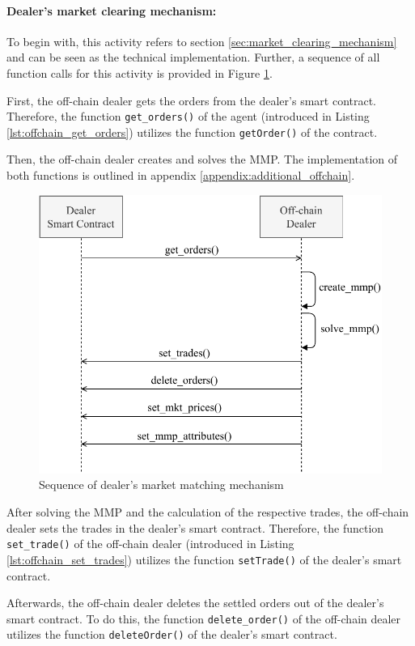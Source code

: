 \paragraph{Dealer's market clearing mechanism:}
To begin with, this activity refers to section \ref{sec:market_clearing_mechanism} and can be seen as
the technical implementation. Further, a sequence of all function 
calls for this activity is provided in Figure \ref{figure:dealers_mmp}.

First, the off-chain dealer gets the orders from the dealer's smart contract.
Therefore, the function \verb|get_orders()| of the agent (introduced in Listing \ref{lst:offchain_get_orders})
utilizes the function \verb|getOrder()| of the contract.

Then, the off-chain dealer creates and solves the MMP.
The implementation of both functions is outlined in appendix \ref{appendix:additional_offchain}.

\begin{figure}[htbp]
	\centering
	\includegraphics[width=.8\linewidth]{./figures/dealers_mmp.pdf}
	\caption{Sequence of dealer's market matching mechanism}
	\label{figure:dealers_mmp}
\end{figure}

After solving the MMP and the calculation of the respective 
trades, the off-chain dealer sets the trades in the dealer's smart contract.
Therefore, the function \verb|set_trade()| of the off-chain dealer (introduced in Listing \ref{lst:offchain_set_trades})
utilizes the function \verb|setTrade()| of the dealer's smart contract.

Afterwards, the off-chain dealer deletes the settled orders out of the dealer's
smart contract. 
To do this, the function \verb|delete_order()| of the off-chain dealer
utilizes the function \verb|deleteOrder()| of the dealer's smart contract.

